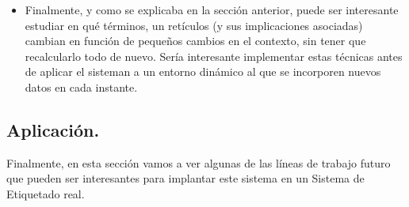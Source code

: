 \begin{itemize}
	\item Finalmente, y como se explicaba en la sección anterior, puede ser interesante estudiar en qué términos, un retículos (y sus implicaciones asociadas) cambian en función de pequeños cambios en el contexto, sin tener que recalcularlo todo de nuevo. Sería interesante implementar estas técnicas antes de aplicar el sisteman a un entorno dinámico al que se incorporen nuevos datos en cada instante.


\end{itemize}





\subsection{Aplicación.}

Finalmente, en esta sección vamos a ver algunas de las líneas de trabajo futuro que pueden ser interesantes para implantar este sistema en un Sistema de Etiquetado real.

